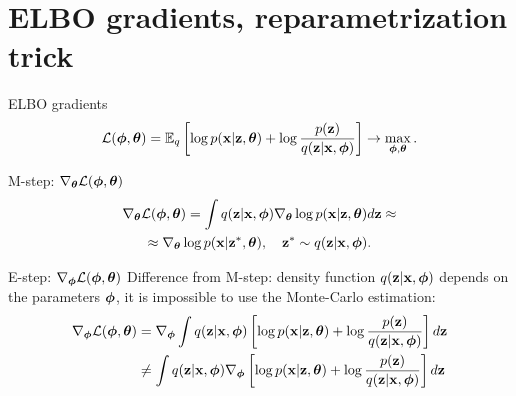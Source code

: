 \section{ELBO gradients, reparametrization trick}
\begin{frame}{ELBO gradients}
	\[
		 \mathcal{L} (\bphi, \btheta)  = \mathbb{E}_{q} \left[\log p(\bx | \bz, \btheta) + \log \frac{p(\bz)}{q(\bz | \bx, \bphi)} \right] \rightarrow \max_{\bphi, \btheta}.
	\]	
	\begin{block}{M-step: $\nabla_{\btheta} \mathcal{L}(\bphi, \btheta)$}
		\vspace{-0.7cm}
		\begin{multline*}
			\nabla_{\btheta} \mathcal{L} (\bphi, \btheta)
			= \int q(\bz|\bx, \bphi) \nabla_{\btheta}\log p(\bx|\bz, \btheta) d \bz \approx  \\
			\approx \nabla_{\btheta}\log p(\bx|\bz^*, \btheta), \quad \bz^* \sim q(\bz|\bx, \bphi).
		\end{multline*}
		\vspace{-0.7cm}
	\end{block}
	\begin{block}{E-step: $\nabla_{\bphi} \mathcal{L}(\bphi, \btheta)$}
	Difference from M-step: density function $q(\bz| \bx, \bphi)$ depends on the parameters $\bphi$, it is impossible to use the Monte-Carlo estimation:
	\begin{align*}
		\nabla_{\bphi} \mathcal{L} (\bphi, \btheta) &= \nabla_{\bphi} \int q(\bz | \bx, \bphi) \left[\log p(\bx | \bz, \btheta) + \log \frac{p(\bz)}{q(\bz| \bx, \bphi)} \right] d \bz \\
		& \neq  \int q(\bz | \bx, \bphi) \nabla_{\bphi} \left[\log p(\bx | \bz, \btheta) + \log \frac{p(\bz)}{q(\bz| \bx, \bphi)} \right] d \bz \\
	\end{align*}
	\end{block}
\end{frame}
